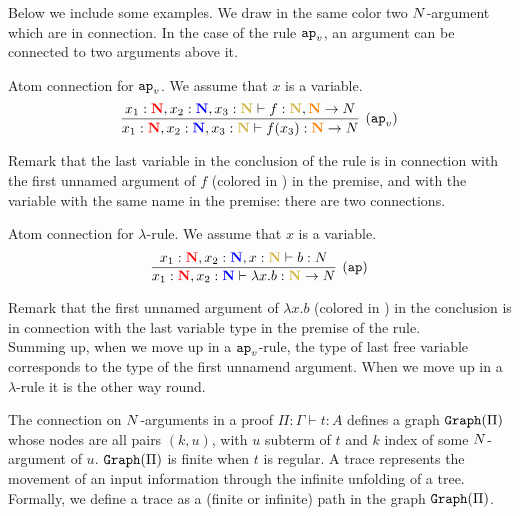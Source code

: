 Below we include some examples. 
We draw in the same color two ${N}$-argument which are in connection. 
In the case of the rule $\apvar$, an argument can be connected to two arguments above it.


\begin{Eg}\label{eg:3}%
Atom connection for $\apvar$.
We assume that $x$ is a variable.
\[
\infer[(\apvar)]{
  x_1 : \bfColor{red}{\N},{x_2} : \bfColor{blue}{\N}, x_3  : \bfColor{oldgold}{\N}
  \prove f(x_3) : \bfColor{orange}{\N} \rightarrow \N
}{
  x_1 : \bfColor{red}{\N},{x_2} : \bfColor{blue}{\N}, x_3  : \bfColor{oldgold}{\N}
  \prove f : \bfColor{oldgold}{\N}, \bfColor{orange}{\N} \rightarrow \N
}
\]
\end{Eg}

Remark that the last variable in the conclusion of the rule
is in connection with the first unnamed argument of $f$ (colored in ) 
in the premise, and with the variable with the same name in the premise: there are
two connections.

\begin{Eg}\label{eg:4}%
Atom connection for  $\lambda$-rule.
We assume that $x$ is  a variable.
\[
\infer[(\ap)]{
  x_1: \bfColor{red}{\N}, x_2: \bfColor{blue}{\N}
  \prove \lambda x.b : \bfColor{oldgold}{\N} \rightarrow \N
}{
  x_1: \bfColor{red}{\N}, x_2: \bfColor{blue}{\N}, x:\bfColor{oldgold}{\N} \prove b : \N
}
\]
\end{Eg}
Remark that the first unnamed argument of $\lambda x.b$ (colored in ) 
in the conclusion is in connection with the last variable type in the premise of the rule.
\\

Summing up, when
we move up in a $\apvar$-rule, the type of last free variable corresponds to the type of the first
unnamend argument.
When  we move up in a $\lambda$-rule it is the other way round. 

The connection on ${N}$-arguments in a proof $\Pi:\Gamma\vdash t:A$ defines a graph ${\tt Graph}(\Pi)$ 
whose nodes are all pairs $(k,u)$, with $u$ subterm of $t$ and $k$ index of some ${N}$-argument of  $u$.
${\tt Graph}(\Pi)$ is finite when $t$ is regular.
A trace represents the movement of an input information through the infinite unfolding of a tree.
Formally, we define a trace as a (finite or infinite) path in the graph ${\tt Graph}(\Pi)$.


